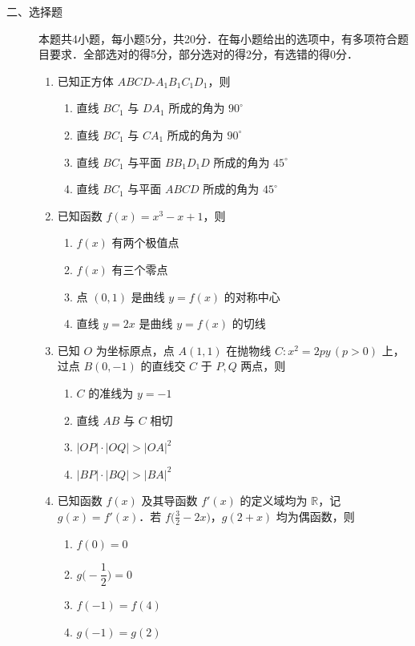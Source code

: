 \begin{description}
    \item[二、选择题] 本题共4小题，每小题5分，共20分．在每小题给出的选项中，有多项符合题目要求．全部选对的得5分，部分选对的得2分，有选错的得0分．
    \begin{enumerate}[leftmargin=5pt]
      \addtocounter{enumi}{+8}
        \item 已知正方体 $ABCD$-$A_1B_1C_1D_1$，则
        \begin{enumerate}[label=\Alph*.]
            \item 直线 $BC_1$ 与 $DA_1$ 所成的角为 $90^\circ$
            \item 直线 $BC_1$ 与 $CA_1$ 所成的角为 $90^\circ$
            \item 直线 $BC_1$ 与平面 $BB_1D_1D$ 所成的角为 $45^\circ$
            \item 直线 $BC_1$ 与平面 $ABCD$ 所成的角为 $45^\circ$
        \end{enumerate}

        \item 已知函数 $f(x)=x^3-x+1$，则
        \begin{enumerate}[label=\Alph*.]
            \item $f(x)$ 有两个极值点
            \item $f(x)$ 有三个零点
            \item 点 $(0,1)$ 是曲线 $y=f(x)$ 的对称中心
            \item 直线 $y=2x$ 是曲线 $y=f(x)$ 的切线
        \end{enumerate}

        \item 已知 $O$ 为坐标原点，点 $A(1,1)$ 在抛物线 $C:x^2=2py\,(p>0)$ 上，过点 $B(0,-1)$ 的直线交 $C$ 于 $P,Q$ 两点，则
        \begin{enumerate}[label=\Alph*.]
            \item $C$ 的准线为 $y=-1$
            \item 直线 $AB$ 与 $C$ 相切
            \item $|OP|\cdot|OQ|>|OA|^2$
            \item $|BP|\cdot|BQ|>|BA|^2$
        \end{enumerate}

        \item 已知函数 $f(x)$ 及其导函数 $f'(x)$ 的定义域均为 $\mathbb{R}$，记 $g(x)=f'(x)$．若 $f\bigl(\frac{3}{2}-2x\bigr)$，$g(2+x)$ 均为偶函数，则
        \begin{enumerate}[label=\Alph*.]
            \item $f(0)=0$
            \item $g\bigl(-\dfrac{1}{2}\bigr)=0$
            \item $f(-1)=f(4)$
            \item $g(-1)=g(2)$
        \end{enumerate}
    \end{enumerate}
\end{description}

